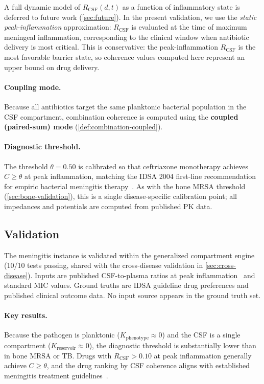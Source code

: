 \documentclass[11pt]{article}
\theoremstyle{plain}
\theoremstyle{definition}
\newcommand{\Kpheno}{K_{\mathrm{phenotype}}}
\newcommand{\Kres}{K_{\mathrm{reservoir}}}
\begin{document}
A full dynamic model of $R_{\mathrm{CSF}}(d, t)$ as a function of
inflammatory state is deferred to future work (\cref{sec:future}).
In the present validation, we use the \emph{static
peak-inflammation} approximation: $R_{\mathrm{CSF}}$ is evaluated
at the time of maximum meningeal inflammation, corresponding to the
clinical window when antibiotic delivery is most critical. This
is conservative: the peak-inflammation $R_{\mathrm{CSF}}$ is the
most favorable barrier state, so coherence values computed here
represent an upper bound on drug delivery.

\paragraph{Coupling mode.}
Because all antibiotics target the same planktonic bacterial
population in the CSF compartment, combination coherence is
computed using the \textbf{coupled (paired-sum) mode}
(\cref{def:combination-coupled}).

\paragraph{Diagnostic threshold.}
The threshold $\theta = 0.50$ is calibrated so that ceftriaxone
monotherapy achieves $C \geq \theta$ at peak inflammation, matching
the IDSA 2004 first-line recommendation for empiric bacterial
meningitis therapy~\cite{Tunkel2004}. As with the bone MRSA
threshold (\cref{sec:bone-validation}), this is a single
disease-specific calibration point; all impedances and potentials
are computed from published PK data.

\subsection{Validation}
\label{sec:men-validation}

The meningitis instance is validated within the generalized
compartment engine (10/10 tests passing, shared with the
cross-disease validation in \cref{sec:cross-disease}). Inputs
are published CSF-to-plasma ratios at peak
inflammation~\cite{Nau2010, Lutsar2000} and standard MIC values.
Ground truths are IDSA guideline drug preferences and published
clinical outcome data. No input source appears in the ground
truth set.

\paragraph{Key results.}
Because the pathogen is planktonic ($\Kpheno \approx 0$) and the
CSF is a single compartment ($\Kres \approx 0$), the diagnostic
threshold is substantially lower than in bone MRSA or TB. Drugs
with $R_{\mathrm{CSF}} > 0.10$ at peak inflammation generally
achieve $C \geq \theta$, and the drug ranking by CSF coherence
aligns with established meningitis treatment
guidelines~\cite{Tunkel2004}.
\end{document}
